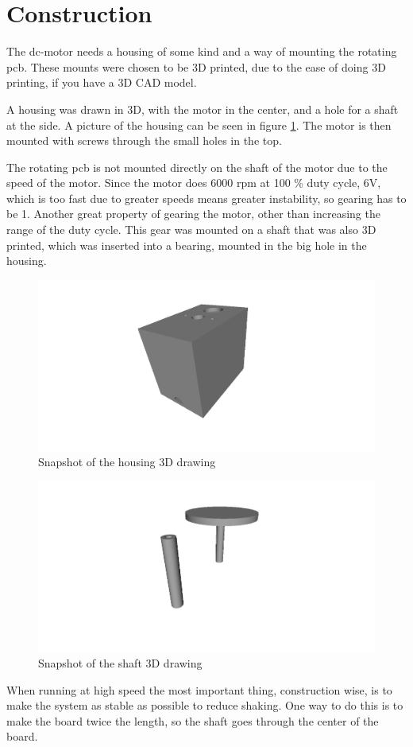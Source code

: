 \section{Construction}
The dc-motor needs a housing of some kind and a way of mounting the rotating pcb.
These mounts were chosen to be 3D printed, due to the ease of doing 3D printing, if you have a 3D CAD model.

A housing was drawn in 3D, with the motor in the center, and a hole for a shaft at the side. 
A picture of the housing can be seen in figure \ref{fig:housing3D}.
The motor is then mounted with screws through the small holes in the top.

The rotating pcb is not mounted directly on the shaft of the motor due to the speed of the motor.
Since the motor does 6000 rpm at 100 \% duty cycle, 6V, which is too fast due to greater speeds means greater instability, so gearing has to be 1.
Another great property of gearing the motor, other than increasing the range of the duty cycle.
This gear was mounted on a shaft that was also 3D printed, which was inserted into a bearing, mounted in the big hole in the housing.

\begin{figure}
 \centering
 \includegraphics[width=\textwidth]{img/housing3D}
 \caption{Snapshot of the housing 3D drawing}
 \label{fig:housing3D}
\end{figure}

\begin{figure}
 \centering
 \includegraphics[width=\textwidth]{img/shaft_3d}
 \caption{Snapshot of the shaft 3D drawing}
 \label{fig:shaft3D}
\end{figure}

When running at high speed the most important thing, construction wise, is to make the system as stable as possible to reduce shaking.
One way to do this is to make the board twice the length, so the shaft goes through the center of the board. 